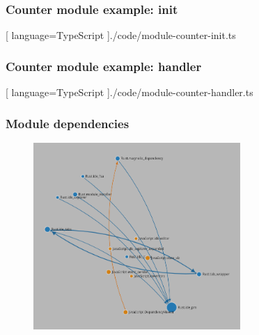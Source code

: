 \begin{frame}
  \frametitle{Counter module example: init}
  \begin{center}
    
    [ language=TypeScript
    ]{./code/module-counter-init.ts}
  \end{center}
\end{frame}

\begin{frame}
  \frametitle{Counter module example: handler}
  \begin{center}
    
    [ language=TypeScript
    ]{./code/module-counter-handler.ts}
  \end{center}
\end{frame}


\begin{frame}
  \frametitle{Module dependencies}
  \begin{figure}
    \centering
      \includegraphics[width=0.7\textwidth]{./pics/module-dependencies.png}
  \end{figure}
\end{frame}

